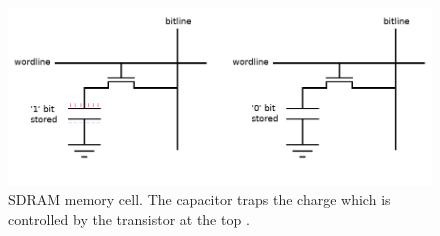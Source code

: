 \documentclass[12pt]{report}
\begin{document}
\begin{figure}[h]
    \centering
    \includegraphics[scale=0.4]{figures/DRAM.jpg}
    \caption{SDRAM memory cell. The capacitor traps the charge which is controlled by the transistor at the top \citep{SDRAMFLASH}.}
    \label{fig:7}
\end{figure}
\end{document}
